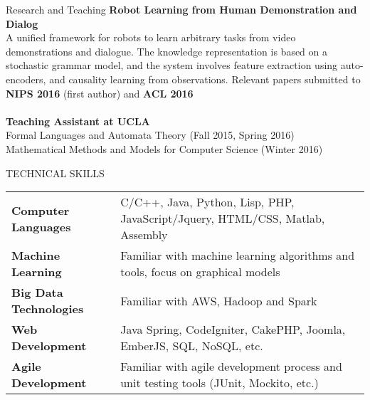 \documentclass{resume} %
\begin{document}

\begin{rSection}{Research and Teaching}
\textbf{Robot Learning from Human Demonstration and Dialog}\\
A unified framework for robots to learn arbitrary tasks from video demonstrations and dialogue. The knowledge representation is based on a stochastic grammar model, and the system involves feature extraction using auto-encoders, and causality learning from observations. Relevant papers submitted to \textbf{NIPS 2016} (first author) and \textbf{ACL 2016}\\\\
\textbf{Teaching Assistant at UCLA}\\  
Formal Languages and Automata Theory (Fall 2015, Spring 2016)\\
Mathematical Methods and Models for Computer Science (Winter 2016)
\end{rSection}



\begin{rSection}{TECHNICAL SKILLS}

\begin{tabular}{ @{} >{\bfseries}l @{\hspace{6ex}} l }
Computer Languages & C/C++, Java, Python, Lisp, PHP, JavaScript/Jquery, HTML/CSS, Matlab, Assembly \\
Machine Learning & Familiar with machine learning algorithms and tools, focus on graphical models \\
Big Data Technologies & Familiar with AWS, Hadoop and Spark \\
Web Development & Java Spring, CodeIgniter, CakePHP, Joomla, EmberJS, SQL, NoSQL, etc. \\
Agile Development & Familiar with agile development process and unit testing tools (JUnit, Mockito, etc.) \\
\end{tabular}
\end {rSection}


\end{document}
